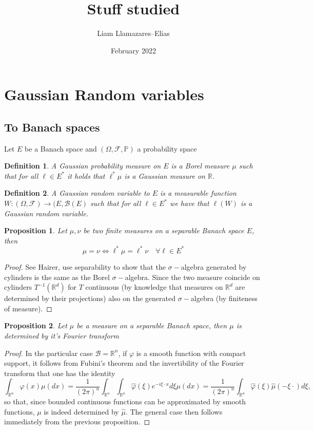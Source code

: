 \documentclass[12pt]{article}
\newcommand{\R}{{\mathbb R}}
\newtheorem{proposition}{Proposition}
\newtheorem{definition}{Definition}
\begin{document}
\title{Stuff studied}
\author{Liam Llamazares--Elias}
\date{February 2022}
\maketitle
\section{Gaussian Random variables}
\subsection{To Banach spaces}
Let $E$ be a Banach space and $(\Omega,\mathcal{F},\mathbb{P})$ a probability space
\begin{definition}
	A \emph{Gaussian probability measure on $E$} is a Borel measure $\mu$ such that  for all \(\ell\in E^*\) it holds that \(\ell^*\mu\)  is a Gaussian measure on $\R$.
\end{definition}
\begin{definition}
	A Gaussian random variable to $E$ is a measurable function \(W:(\Omega,\mathcal{F})\to (E,\mathcal{B}(E)\) such that for all \(\ell\in E^*\) we have that \(\ell(W)\) is a Gaussian random variable.
\end{definition}
\begin{proposition}
	Let $\mu,\nu$ be two finite measures on a separable Banach space $E$, then
	\begin{equation*}
		\mu=\nu\iff \ell^*\mu=\ell^*\nu\quad\forall \ell\in E^*
	\end{equation*}
\end{proposition}
\begin{proof}
	See Hairer, use separability to show that the $\sigma-$algebra generated by cylinders is the same as the Borel $\sigma-$algebra. Since the two measure coincide on cylinders $T^{-1}(\R^d)$ for $T$ continuous (by knowledge that measures on $\R^d$ are determined by their projections) also on the generated $\sigma-$algebra (by finiteness of measure).
\end{proof}
\begin{proposition}
	Let $\mu$ be a measure on a separable Banach space, then $\mu$ is determined by it's Fourier transform
\end{proposition}
\begin{proof}
	In the particular case $\mathcal{B}=\mathbb{R}^{n}$, if $\varphi$ is a smooth function with compact support, it follows from Fubini's theorem and the invertibility of the Fourier transform that one has the identity
	$$
		\int_{\mathbb{R}^{n}} \varphi(x) \mu(d x)=\frac{1}{(2 \pi)^{n}} \int_{\mathbb{R}^{n}} \int_{\mathbb{R}^{n}} \hat{\varphi}(\xi) e^{-i \xi\cdot x} d \xi \mu(d x)=\frac{1}{(2 \pi)^{n}} \int_{\mathbb{R}^{n}} \hat{\varphi}(\xi) \hat{\mu}(-\xi\cdot) d \xi,
	$$
	so that, since bounded continuous functions can be approximated by smooth functions, $\mu$ is indeed determined by $\hat{\mu}$. The general case then follows immediately from the previous proposition.
\end{proof}
\end{document}
